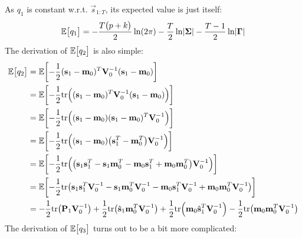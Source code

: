 		As \(q_1\) is constant w.r.t. \( \vec{s}_{1:T} \), its expected value is just itself:
		\begin{equation*}
			\mathbb{E}\mathopen{}\left[ {q_1}_{{}_{}}\,\negthickspace\right]\mathclose{} = -\frac{T \mathopen{}\left( {p + k}_{{}_{}}\,\negthickspace\right)\mathclose{}}{2} \ln \mathopen{}\left( {2\pi}_{{}_{}}\,\negthickspace\right)\mathclose{} - \frac{T}{2} \ln \lvert \boldsymbol{\mathrm{\Sigma}} \rvert - \frac{T - 1}{2} \ln \lvert \boldsymbol{\mathrm{\Gamma}} \rvert
		\end{equation*}
		The derivation of \( \mathbb{E}\mathopen{}\left[ {q_2}_{{}_{}}\,\negthickspace\right]\mathclose{} \) is also simple:
		\begin{align*}
			\E\bracket{q_2}
				&= \E\bracket{-\frac{1}{2} \paren{\vec{s}_1 - \vec{m}_0}^T \mat{V}_0^{-1} \paren{\vec{s}_1 - \vec{m}_0}} \\
				&= \E\bracket{-\frac{1}{2} \tr\paren{ \paren{\vec{s}_1 - \vec{m}_0}^T \mat{V}_0^{-1} \paren{\vec{s}_1 - \vec{m}_0} }} \\
				&= \E\bracket{-\frac{1}{2} \tr\paren{ \paren{\vec{s}_1 - \vec{m}_0} \paren{\vec{s}_1 - \vec{m}_0}^T \mat{V}_0^{-1} }} \\
				&= \E\bracket{-\frac{1}{2} \tr\paren{ \paren{\vec{s}_1 - \vec{m}_0} \paren{\vec{s}_1^T - \vec{m}_0^T} \mat{V}_0^{-1} }} \\
				&= \E\bracket{-\frac{1}{2} \tr\paren{ \paren{\vec{s}_1 \vec{s}_1^T - \vec{s}_1 \vec{m}_0^T - \vec{m}_0 \vec{s}_1^T + \vec{m}_0 \vec{m}_0^T} \mat{V}_0^{-1} }} \\
				&= \E\bracket{-\frac{1}{2} \tr\paren{ \vec{s}_1 \vec{s}_1^T \mat{V}_0^{-1} - \vec{s}_1 \vec{m}_0^T \mat{V}_0^{-1} - \vec{m}_0 \vec{s}_1^T \mat{V}_0^{-1} + \vec{m}_0 \vec{m}_0^T \mat{V}_0^{-1} }} \\
				&= -\frac{1}{2} \tr\paren{\mat{P}_1 \mat{V}_0^{-1}} + \frac{1}{2} \tr\paren{\hat{\vec{s}}_1 \vec{m}_0^T \mat{V}_0^{-1}} + \frac{1}{2} \tr\paren{\vec{m}_0 \hat{\vec{s}}_1^T \mat{V}_0^{-1}} - \frac{1}{2} \tr\paren{\vec{m}_0 \vec{m}_0^T \mat{V}_0^{-1}} \\
		\end{align*}
		The derivation of \( \mathbb{E}\mathopen{}\left[ {q_3}_{{}_{}}\,\negthickspace\right]\mathclose{} \) turns out to be a bit more complicated:
